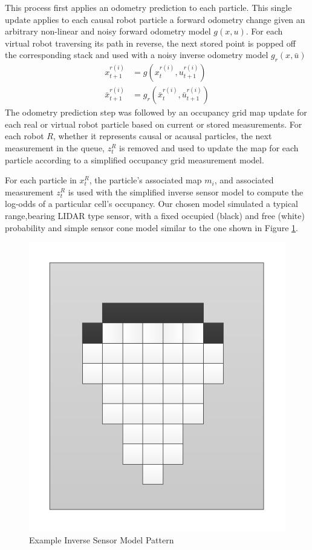 This process first applies an odometry prediction to each particle. This single update applies to each causal robot particle a forward odometry change given an arbitrary non-linear and noisy forward odometry model $g(x,u)$. For each virtual robot traversing its path in reverse, the next stored point is popped off the corresponding stack and used with a noisy inverse odometry model $g_r(x,\bar{u})$
\begin{align*}
x_{t+1}^{r(i)} &= g(x_{t}^{r(i)},u_{t+1}^{r(i)})\\
\bar{x}_{t+1}^{r(i)} &= g_r(\bar{x}_t^{r(i)}, \bar{u}_{t+1}^{r(i)})
\end{align*}
The odometry prediction step was followed by an occupancy grid map update for each real or virtual robot particle based on current or stored measurements. For each robot $R$, whether it represents causal or acausal particles, the next measurement in the queue, $z_t^R$ is removed and used to update the map for each particle according to a simplified occupancy grid measurement model.

For each particle in $x_t^R$,  the particle's associated map $m_i$, and associated measurement $z_t^R$ is used with the simplified inverse sensor model to compute the log-odds of a particular cell’s occupancy. Our chosen model simulated a typical range,bearing LIDAR type sensor, with a fixed occupied (black) and free (white) probability and simple sensor cone model similar to the one shown in Figure \ref{fig:invsensor}.

\begin{figure}[ht]
\centering
\includegraphics[width=\columnwidth]{../FinalFigures/invsensormodel.pdf}
\caption{Example Inverse Sensor Model Pattern}
\label{fig:invsensor}
\end{figure}

